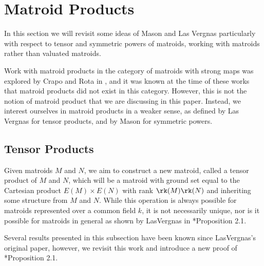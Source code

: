 \section{Matroid Products}\label{sec:MatProds}

In this section we will revisit some ideas of Mason \cite{MGlueing} and Las Vergnas \cite{LV81} particularly with respect to tensor and symmetric powers of matroids, working with matroids rather than valuated matroids.
   
Work with matroid products in the category of matroids with strong maps was explored by Crapo and Rota in \cite{CR70}, and it was known at the time of these works that matroid products did not exist in this category. However, this is not the notion of matroid product that we are discussing in this paper. Instead, we interest ourselves in matroid products in a weaker sense, as defined by Las Vergnas for tensor products, and by Mason for symmetric powers.



\subsection{Tensor Products}\label{subsec:tensorProducts}
    Given matroids $M$ and $N$, we aim to construct a new matroid, called a tensor product of $M$ and $N$, which will be a matroid with ground set equal to the Cartesian product $E(M)\times E(N)$ with rank $\rk(M)\rk(N)$ and inheriting some structure from $M$ and $N$. While this operation is always possible for matroids represented over a common field $k$, it is not necessarily unique, nor is it  possible for matroids in general as shown by LasVergnas in \cite{LV81}*{Proposition 2.1}. 
    
    Several results presented in this subsection have been known since LasVergnas's original paper, however, we revisit this work and introduce a new proof of \cite{LV81}*{Proposition 2.1}.
    
